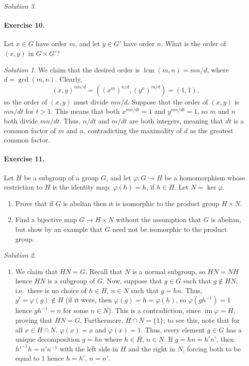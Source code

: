 \documentclass[11pt]{report}
\DeclareMathOperator\lcm{lcm}
\DeclareMathOperator\im{im}
\theoremstyle{remark}
\newtheorem*{solution}{Solution}
\begin{document}
\begin{solution}
    \paragraph{Exercise 10.} Let $x \in G$ have order $m$, and let $y \in G'$ have
    order $n$. What is the order of $(x, y)$ in $G \times G'$?
    \begin{solution}
        We claim that the desired order is $\lcm(m, n) = mn / d$, where $d = \gcd(m,
        n)$. Clearly, \[
            (x, y)^{mn / d} = ((x^m)^{n / d}, (y^n)^{m / d}) = (1, 1),
        \] so the order of $(x, y)$ must divide $mn / d$. Suppose that the order of
        $(x, y)$ is $mn / dt$ for $t > 1$. This means that both $x^{mn / dt} = 1$
        and $y^{mn / dt} = 1$, so $m$ and $n$ both divide $mn / dt$. Thus, $n / dt$
        and $m / dt$ are both integers, meaning that $dt$ is a common factor of $m$
        and $n$, contradicting the maximality of $d$ as the greatest common factor.
    \end{solution}
    
    \paragraph{Exercise 11.} Let $H$ be a subgroup of a group $G$, and let
    $\varphi\colon G \to H$ be a homomorphism whose restriction to $H$ is the
    identity map: $\varphi(h) = h$, if $h \in H$. Let $N = \ker{\varphi}$.
    \begin{enumerate}
        \itemsep0em
        \item Prove that if $G$ is abelian then it is isomorphic to the product
        group $H \times N$.
        \item Find a bijective map $G \to H \times N$ without the assumption that
        $G$ is abelian, but show by an example that $G$ need not be isomorphic to
        the product group.
    \end{enumerate}
    \begin{solution} \mbox{}
    \begin{enumerate}
        \item We claim that $HN = G$. Recall that $N$ is a normal subgroup, so $HN =
        NH$ hence $HN$ is a subgroup of $G$. Now, suppose that $g \in G$ such that
        $g \notin HN$, i.e.\ there is no choice of $h \in H$, $n \in N$ such that $g
        = hn$. Thus, $g' = \varphi(g) \notin H$ (if it were, then $\varphi(g) = h =
        \varphi(h)$, so $\varphi(gh^{-1}) = 1$ hence $gh^{-1} = n$ for some $n \in
        N$). This is a contradiction, since $\im{\varphi} = H$, proving that $HN =
        G$. Furthermore, $H \cap N = \{1\}$; to see this, note that for all $x \in H
        \cap N$, $\varphi(x) = x$ and $\varphi(x) = 1$. Thus, every element $g \in
        G$ has a unique decomposition $g = hn$ where $h \in H$, $n \in N$. If $g =
        hn = h'n'$, then $h'^{-1}h = n'n^{-1}$ with the left side in $H$ and the
        right in $N$, forcing both to be equal to $1$ hence $h = h'$, $n = n'$.


\end{enumerate}
\end{solution}
\end{solution}
\end{document}
